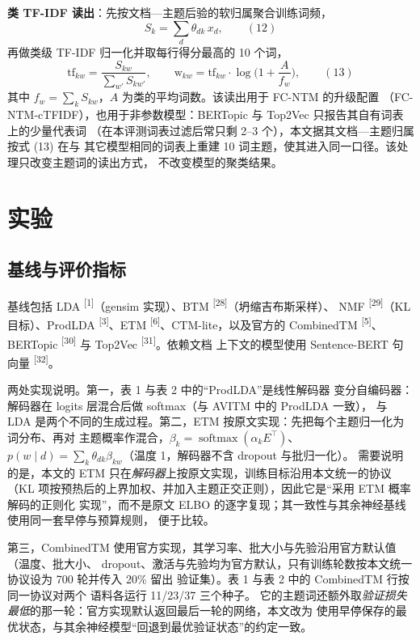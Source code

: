 \documentclass{article}
\begin{document}
\textbf{类 TF-IDF 读出}：先按文档—主题后验的软归属聚合训练词频，
\begin{equation}
S_k=\sum_{d}\theta_{dk}\,x_d ,
\qquad(12)\end{equation}
再做类级 TF-IDF 归一化并取每行得分最高的 10 个词，
\begin{equation}
\mathrm{tf}_{kw}=\frac{S_{kw}}{\sum_{w'}S_{kw'}},\qquad
\mathrm{w}_{kw}=\mathrm{tf}_{kw}\cdot\log\!\Big(1+\frac{A}{f_w}\Big),
\label{eq:ctfidf}
\qquad(13)\end{equation}
其中 $f_w=\sum_k S_{kw}$，$A$ 为类的平均词数。该读出用于 FC-NTM 的升级配置
（FC-NTM-cTFIDF），也用于非参数模型：BERTopic 与 Top2Vec 只报告其自有词表上的少量代表词
（在本评测词表过滤后常只剩 2--3 个），本文据其文档—主题归属按式 (13) 在与
其它模型相同的词表上重建 10 词主题，使其进入同一口径。该处理只改变主题词的读出方式，
不改变模型的聚类结果。

\section{实验}

\subsection{基线与评价指标}

基线包括 LDA \textsuperscript{[1]}（gensim 实现）、BTM \textsuperscript{[28]}（坍缩吉布斯采样）、
NMF \textsuperscript{[29]}（KL 目标）、ProdLDA \textsuperscript{[3]}、ETM
\textsuperscript{[6]}、CTM-lite，以及官方的 CombinedTM \textsuperscript{[5]}、
BERTopic \textsuperscript{[30]} 与 Top2Vec \textsuperscript{[31]}。依赖文档
上下文的模型使用 Sentence-BERT 句向量 \textsuperscript{[32]}。

两处实现说明。第一，表 1 与表 2 中的“ProdLDA”是线性解码器
变分自编码器：解码器在 logits 层混合后做 softmax（与 AVITM 中的 ProdLDA 一致），
与 LDA 是两个不同的生成过程。第二，ETM 按原文实现：先把每个主题归一化为词分布、再对
主题概率作混合，$\beta_k=\operatorname{softmax}(\alpha_k E^{\top})$、
$p(w\mid d)=\sum_k\theta_{dk}\beta_{kw}$（温度 1，解码器不含 dropout 与批归一化）。
需要说明的是，本文的 ETM 只在\emph{解码器}上按原文实现，训练目标沿用本文统一的协议
（KL 项按预热后的上界加权、并加入主题正交正则），因此它是“采用 ETM 概率解码的正则化
实现”，而不是原文 ELBO 的逐字复现；其一致性与其余神经基线使用同一套早停与预算规则，
便于比较。

第三，CombinedTM 使用官方实现，其学习率、批大小与先验沿用官方默认值（温度、批大小、
dropout、激活与先验均为官方默认，只有训练轮数按本文统一协议设为 700 轮并传入 20\% 留出
验证集）。表 1 与表 2 中的 CombinedTM 行按同一协议对两个
语料各运行 11/23/37 三个种子。
它的主题词还额外取\emph{验证损失最低}的那一轮：官方实现默认返回最后一轮的网络，本文改为
使用早停保存的最优状态，与其余神经模型“回退到最优验证状态”的约定一致。
\end{document}
